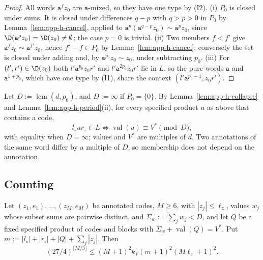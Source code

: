 \begin{proof}
All words $\mathtt a^fz_0$ are $\mathtt a$-mixed, so they have one type by (I2).
(i) $P_0$ is closed under sums.  It is closed under differences $q-p$ with
$q>p>0$ in $P_0$ by Lemma~\ref{lem:app-h-cancel}, applied to
$\mathtt a^p(\mathtt a^{q-p}z_0)\sim\mathtt a^pz_0$, since $\D(\mathtt
a^pz_0)=\D(z_0)\ne\emptyset$; the case $p=0$ is trivial.
(ii) Two members $f<f'$ give $\mathtt a^fz_0\sim\mathtt a^{f'}z_0$, hence
$f'-f\in P_0$ by Lemma~\ref{lem:app-h-cancel}; conversely the set is closed
under adding and, by $\mathtt a^{p_0}z_0\sim z_0$, under subtracting $p_0$.  (iii)
For $(l',r')\in\D(z_0)$ both $l'\mathtt a^{p_0}z_0r'$ and $l'\mathtt
a^{2p_0}z_0r'$ lie in $L$, so the pure words $\mathtt a$ and $\mathtt a^{1+p_0}$,
which have one type by (I1), share the context $(l'\mathtt a^{p_0-1},z_0r')$.
\end{proof}

Let $D:=\operatorname{lcm}(d,p_0)$, and $D:=\infty$ if $P_0=\{0\}$.  By
Lemma~\ref{lem:app-h-collapse} and Lemma~\ref{lem:app-h-period}(ii), for
every specified product $u$ as above that contains a code,
\begin{equation}
\label{eq:app-h-member}
 l_\circ ur_\circ\in L\iff\operatorname{val}(u)\equiv V^*\pmod D,
\end{equation}
with equality when $D=\infty$; values and $V^*$ are multiples of $d$.  Two
annotations of the same word differ by a multiple of $D$, so membership does
not depend on the annotation.

\subsection{Counting}

\begin{lemma}
\label{lem:app-h-count}
Let $(z_1,e_1),\ldots,(z_M,e_M)$ be annotated codes, $M\ge6$, with
$|z_j|\le\ell_z$, values $w_j$ whose subset sums are pairwise distinct, and
$\Sigma_w:=\sum_jw_j<D$, and let $Q$ be a fixed specified product of codes and
blocks with $\Sigma_w+\operatorname{val}(Q)=V^*$.  Put $m:=|l_\circ|+|r_\circ|
+|Q|+\sum_j|z_j|$.  Then
\[
 (27/4)^{\lfloor M/3\rfloor}\le(M+1)^2k_V(m+1)^2(M\ell_z+1)^2.
\]
\end{lemma}

